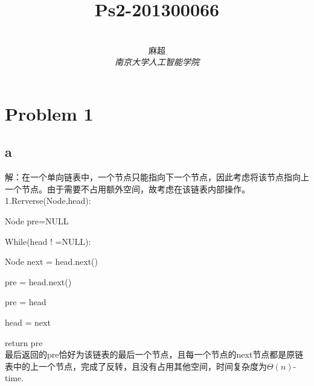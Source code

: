 \documentclass[12pt,a4paper]{article}
\title{\textbf{Ps2-201300066}}%
\author{
\\
\Large{麻超 \quad 201300066}
\\[6pt]
{ \large \textit{南京大学人工智能学院}}\\[2pt]
}
\date{}
\begin{document}
\maketitle
\setcounter{page}{1}

\section{Problem 1}
\subsection{a}
解：在一个单向链表中，一个节点只能指向下一个节点，因此考虑将该节点指向上一个节点。由于需要不占用额外空间，故考虑在该链表内部操作。\\
1.Rerverse(Node,head):
\par\setlength\parindent{2em}Node pre=NULL
\par\setlength\parindent{2em}While(head ! =NULL):
\par\setlength\parindent{4em}Node next = head.next()
\par\setlength\parindent{4em}pre = head.next()
\par\setlength\parindent{4em}pre = head
\par\setlength\parindent{4em}head = next
\par\setlength\parindent{2em}return pre\\
最后返回的pre恰好为该链表的最后一个节点，且每一个节点的next节点都是原链表中的上一个节点，完成了反转，且没有占用其他空间，时间复杂度为$\Theta(n)$-time.\\
\end{document}
